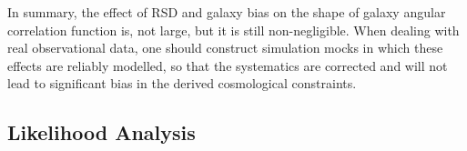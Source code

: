 \documentclass[iop]{emulateapj}
\begin{document}
In summary, the effect of RSD and galaxy bias on the shape of galaxy angular correlation function is, not large, but it is still non-negligible.
When dealing with real observational data, one should construct simulation mocks in which these effects are reliably modelled, 
so that the systematics are corrected and will not lead to significant bias in the derived cosmological constraints.











\subsection{Likelihood Analysis}
\end{document}
